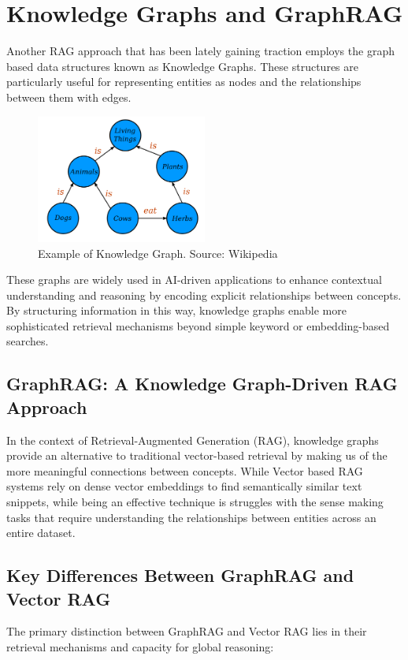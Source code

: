 \section{Knowledge Graphs and GraphRAG}
Another RAG approach that has been lately gaining traction employs the graph based data structures known as Knowledge Graphs. These structures are particularly useful for representing entities as nodes and the relationships between them with edges.
\begin{figure}[h]
    \centering
\includegraphics[width=0.5\textwidth]{IMAGES/Conceptual_Diagram_-_Example.svg.png}
    \caption{Example of Knowledge Graph. Source: Wikipedia\footnotemark}
    \label{fig:Knowledge Graph}
\end{figure}
These graphs are widely used in AI-driven applications to enhance contextual understanding and reasoning by encoding explicit relationships between concepts. By structuring information in this way, knowledge graphs enable more sophisticated retrieval mechanisms beyond simple keyword or embedding-based searches. 

\subsection{GraphRAG: A Knowledge Graph-Driven RAG Approach}
In the context of Retrieval-Augmented Generation (RAG), knowledge graphs provide an alternative to traditional vector-based retrieval by making us of the more meaningful connections between concepts. While Vector based RAG systems rely on dense vector embeddings to find semantically similar text snippets, while being an effective technique is struggles with the sense making tasks that require understanding the relationships between entities across an entire dataset.

\subsection{Key Differences Between GraphRAG and Vector RAG}
The primary distinction between GraphRAG and Vector RAG lies in their retrieval mechanisms and capacity for global reasoning:

